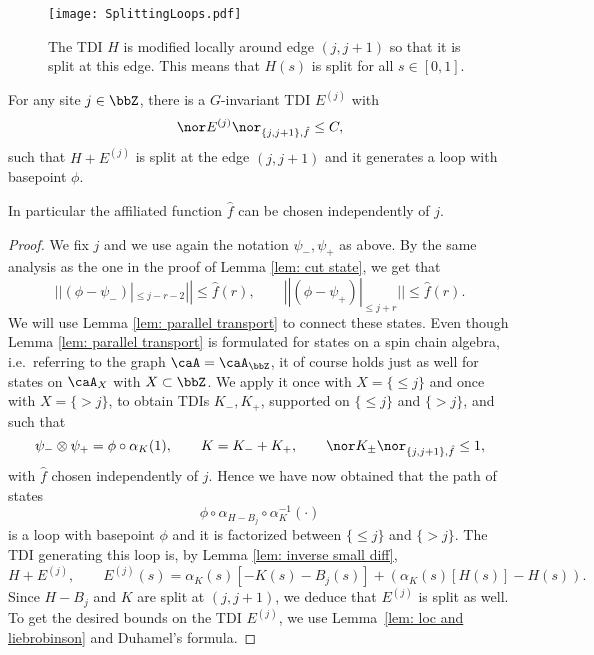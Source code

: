 \begin{figure}[htb]
	\begin{center}
		\texttt{[image: SplittingLoops.pdf]}
		\caption{The TDI $H$ is modified locally around edge $(j,j+1)$ so that it is split at this edge. This means that $H(s)$ is split for all $s\in[0,1]$. }
		\label{fig: splitting loop single edge}
	\end{center}
\end{figure} 


\begin{lemma}\label{lem: splitting single edge}
	For any site $j \in \bbZ$, there is a $G$-invariant TDI $E^{(j)}$ with 
	$$
	\nor E^{(j)} \nor_{\{j,j+1\},\hat{f}} \leq  C,
	$$
	such that $ H+E^{(j)}$  is split at the edge $(j,j+1)$ and it generates a loop with basepoint $\phi$.
\end{lemma}
In particular the affiliated function $\hat{f}$ can be chosen independently of $j$.
\begin{proof}
	We fix $j$ and we use again the notation $\psi_-,\psi_+$ as above. 
	By the same analysis as the one in the proof of Lemma \ref{lem: cut state}, we get that 
	$$
	||(\phi-\psi_-)|_{\leq j-r-2} || \leq \hat{f}(r), \qquad ||(\phi-\psi_+)|_{\leq j+r} ||\leq \hat{f}(r).
	$$
	We will use Lemma \ref{lem: parallel transport} to connect these states. Even though Lemma \ref{lem: parallel transport} is formulated for states on a spin chain algebra, i.e.\ referring to the graph $\caA=\caA_\bbZ$, it of course holds just as well for states on $\caA_X$ with $X\subset\bbZ$. We apply it once with $X=\{\leq j\}$ and once with $X=\{> j\}$, to obtain TDIs $K_-,K_+$,  supported on $\{\leq j\}$ and  $\{> j\}$, and such that 
	$$
	\psi_-\otimes\psi_+  = \phi \circ \alpha_K(1), \qquad K=K_-+K_+, \qquad \nor K_{\pm}\nor_{\{j,j+1\},\hat{f}} \leq 1,
	$$ 
	with $\hat{f}$ chosen independently of $j$. 
	Hence we have now obtained that the path of states
	$$
	\phi\circ \alpha_{H-B_j} \circ \alpha_K^{-1}(\cdot)
	$$ is a loop with basepoint $\phi$ and it is factorized between $\{\leq j\}$ and $\{>j\}$. 
	The TDI generating this loop is, by Lemma \ref{lem: inverse small diff},
	$$
	H+E^{(j)}, \qquad E^{(j)}(s)= \alpha_K(s)[- K(s) - B_j(s)] + ( \alpha_{K}(s)[H(s)] - H(s)).
	$$
	Since $H-B_j$ and $K$ are split at $(j,j+1)$, we deduce that $E^{(j)}$ is split as well. 
	To get the desired bounds on the TDI $E^{(j)}$, we use Lemma~\ref{lem: loc and liebrobinson} and Duhamel's formula.
\end{proof}



